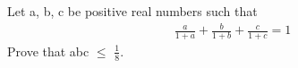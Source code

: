 \item Let a, b, c be positive real numbers such that
\begin{align*}
\frac{a}{1+a} + \frac{b}{1+b} + \frac{c}{1+c} = 1
\end{align*}
Prove that abc $\leq$ $\frac{1}{8}$.
